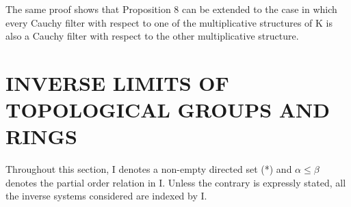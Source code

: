 The same proof shows that Proposition 8 can be extended to the case in which every Cauchy filter with respect to one of the multiplicative structures of K is also a Cauchy filter with respect to the other multiplicative structure.

\section{INVERSE LIMITS OF TOPOLOGICAL GROUPS AND RINGS}

Throughout this section, I denotes a non-empty directed set (*) and \(\alpha \leqslant \beta\) denotes the partial order relation in I. Unless the contrary is expressly stated, all the inverse systems considered are indexed by I.
